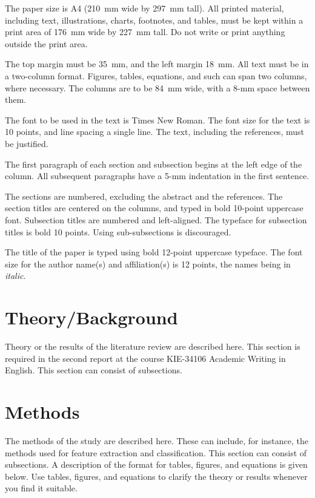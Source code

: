 \documentclass{article}
\begin{document}
The paper size is A4 (210~mm wide by 297~mm tall). All printed material, including text, illustrations, charts, footnotes, and tables, must be kept within a print area of 176~mm wide by 227~mm tall. Do not write or print anything outside the print area.

The top margin must be 35~mm, and the left margin 18~mm.  All text must be in a two-column format. Figures, tables, equations, and such can span two columns, where necessary. The columns are to be 84~mm wide, with a 8-mm space between them.

The font to be used in the text is Times New Roman. The font size for the text is 10 points, and line spacing a single line. The text, including the references, must be justified.

The first paragraph of each section and subsection begins at the left edge of the column. All subsequent paragraphs have a 5-mm indentation in the first sentence.

The sections are numbered, excluding the abstract and the references. The section titles are centered on the columns, and typed in bold 10-point uppercase font. Subsection titles are numbered and left-aligned. The typeface for subsection titles is bold 10 points. Using sub-subsections is discouraged.

The title of the paper is typed using bold 12-point uppercase typeface. The font size for the author name(s) and affiliation(s) is 12 points, the names being in \emph{italic}.

\section{Theory/Background}
\label{sec:theory}

Theory or the results of the literature review are described here. This section is required in the second report at the course KIE-34106 Academic Writing in English. This section can consist of subsections.


\section{Methods}
\label{sec:methods}

The methods of the study are described here. These can include, for instance, the methods used for feature extraction and classification. This section can consist of subsections. A description of the format for tables, figures, and equations is given below. Use tables, figures, and equations to clarify the theory or results whenever you find it suitable.
\end{document}
